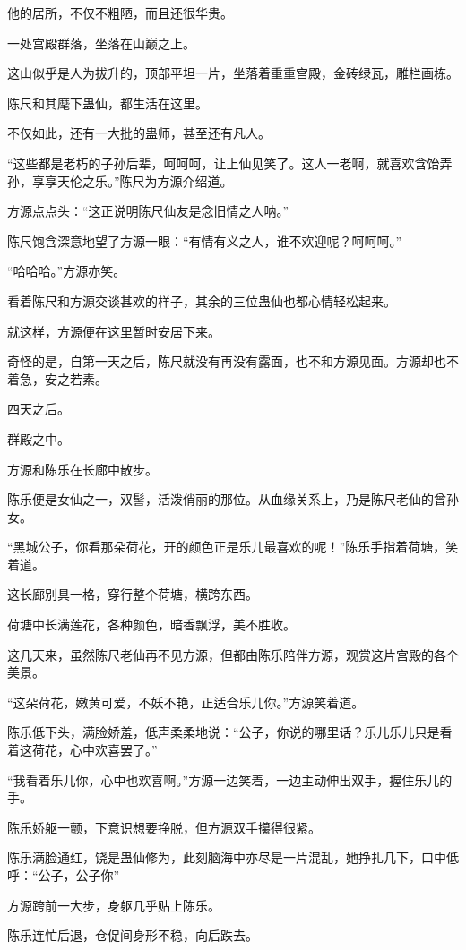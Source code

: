 \begin{this_body}
他的居所，不仅不粗陋，而且还很华贵。

一处宫殿群落，坐落在山巅之上。

这山似乎是人为拔升的，顶部平坦一片，坐落着重重宫殿，金砖绿瓦，雕栏画栋。

陈尺和其麾下蛊仙，都生活在这里。

不仅如此，还有一大批的蛊师，甚至还有凡人。

“这些都是老朽的子孙后辈，呵呵呵，让上仙见笑了。这人一老啊，就喜欢含饴弄孙，享享天伦之乐。”陈尺为方源介绍道。

方源点点头：“这正说明陈尺仙友是念旧情之人呐。”

陈尺饱含深意地望了方源一眼：“有情有义之人，谁不欢迎呢？呵呵呵。”

“哈哈哈。”方源亦笑。

看着陈尺和方源交谈甚欢的样子，其余的三位蛊仙也都心情轻松起来。

就这样，方源便在这里暂时安居下来。

奇怪的是，自第一天之后，陈尺就没有再没有露面，也不和方源见面。方源却也不着急，安之若素。

四天之后。

群殿之中。

方源和陈乐在长廊中散步。

陈乐便是女仙之一，双髻，活泼俏丽的那位。从血缘关系上，乃是陈尺老仙的曾孙女。

“黑城公子，你看那朵荷花，开的颜色正是乐儿最喜欢的呢！”陈乐手指着荷塘，笑着道。

这长廊别具一格，穿行整个荷塘，横跨东西。

荷塘中长满莲花，各种颜色，暗香飘浮，美不胜收。

这几天来，虽然陈尺老仙再不见方源，但都由陈乐陪伴方源，观赏这片宫殿的各个美景。

“这朵荷花，嫩黄可爱，不妖不艳，正适合乐儿你。”方源笑着道。

陈乐低下头，满脸娇羞，低声柔柔地说：“公子，你说的哪里话？乐儿乐儿只是看着这荷花，心中欢喜罢了。”

“我看着乐儿你，心中也欢喜啊。”方源一边笑着，一边主动伸出双手，握住乐儿的手。

陈乐娇躯一颤，下意识想要挣脱，但方源双手攥得很紧。

陈乐满脸通红，饶是蛊仙修为，此刻脑海中亦尽是一片混乱，她挣扎几下，口中低呼：“公子，公子你”

方源跨前一大步，身躯几乎贴上陈乐。

陈乐连忙后退，仓促间身形不稳，向后跌去。


\end{this_body}
